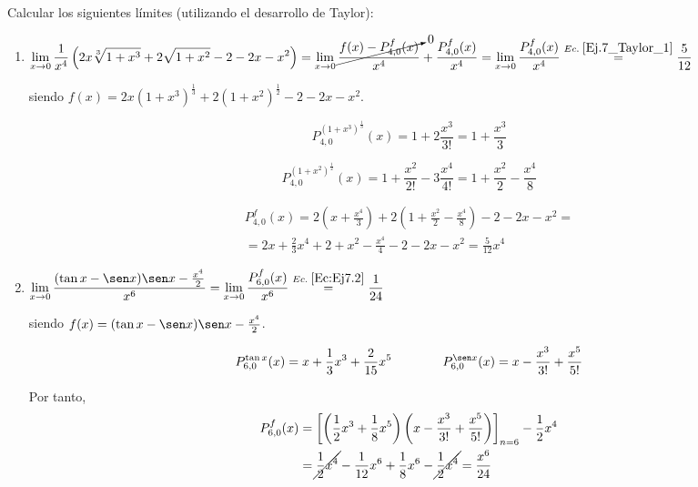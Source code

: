 \begin{ejercicio}
    Calcular los siguientes límites (utilizando el desarrollo de Taylor):
    \begin{enumerate}
        \item $\displaystyle \lim_{x\to 0} \frac{1}{x^4} \left(2x\sqrt[3]{1+x^3} + 2\sqrt{1+x^2}-2-2x-x^2\right)
        = \lim_{x\to 0} \cancelto{0}{\frac{f(x) - P_{4,0}^f(x)}{x^4}} + \frac{P_{4,0}^f(x)}{x^4}
        = \lim_{x\to 0} \frac{P_{4,0}^f(x)}{x^4} \stackrel{Ec.\;\ref{Ej.7_Taylor_1}}{=} \frac{5}{12}$

        siendo $f(x) = 2x(1+x^3)^\frac{1}{3} + 2(1+x^2)^{\frac{1}{2}} - 2- 2x - x^2$.

        \begin{equation*}
            P_{4,0}^{(1+x^3)^\frac{1}{3}}(x) = 1 + 2\frac{x^3}{3!} = 1 + \frac{x^3}{3}
        \end{equation*}

        \begin{equation*}
            P_{4,0}^{(1+x^2)^\frac{1}{2}}(x) = 1 + \frac{x^2}{2!} -3\frac{x^4}{4!}= 1 + \frac{x^2}{2} - \frac{x^4}{8}
        \end{equation*}

        \begin{multline}\label{Ej.7_Taylor_1}
            P_{4,0}^f(x) = 2\left( x + \frac{x^4}{3}\right) + 2\left( 1 + \frac{x^2}{2} - \frac{x^4}{8}\right) - 2-2x-x^2 =
            \\= 2x + \frac{2}{3}x^4 + 2 + x^2 - \frac{x^4}{4} - 2-2x-x^2= \frac{5}{12}x^4
        \end{multline}

        \item $\displaystyle \lim_{x\to 0} \frac{(\tan x - \sen x)\sen x - \frac{x^4}{2}}{x^6} = \lim_{x\to 0} \frac{P_{6,0}^f(x)}{x^6} \stackrel{Ec.\;\ref{Ec:Ej7.2}}{=} \frac{1}{24}$
        
        siendo $f(x) = (\tan x - \sen x)\sen x - \frac{x^4}{2}$.

        \begin{equation*}
            P_{6,0}^{\tan x}(x) = x + \frac{1}{3}x^3 + \frac{2}{15}x^5
            \qquad \qquad
            P_{6,0}^{\sen x}(x) = x - \frac{x^3}{3!} + \frac{x^5}{5!}
        \end{equation*}
        
        Por tanto,
        \begin{equation}\label{Ec:Ej7.2}
        \begin{split}
            P_{6,0}^{f}(x) &= \left[\left(\frac{1}{2}x^3 + \frac{1}{8}x^5\right)\left(x - \frac{x^3}{3!} + \frac{x^5}{5!}\right) \right]_{n=6} - \frac{1}{2}x^4 \\&= \cancel{\frac{1}{2}x^4} - \frac{1}{12}x^6 + \frac{1}{8}x^6 - \cancel{\frac{1}{2}x^4} = \frac{x^6}{24}
        \end{split}\end{equation}


\end{enumerate}
\end{ejercicio}
